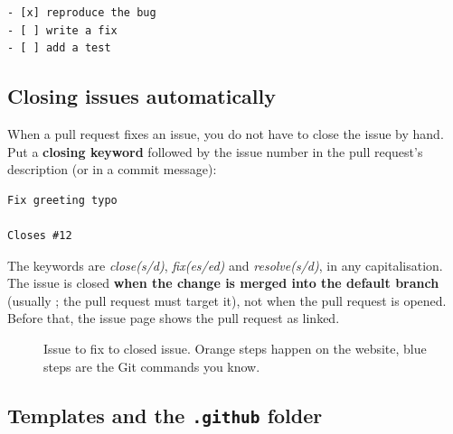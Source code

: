 \begin{lstlisting}
- [x] reproduce the bug
- [ ] write a fix
- [ ] add a test
\end{lstlisting}

\subsection{Closing issues automatically}

When a pull request fixes an issue, you do not have to close the issue by hand. Put a \textbf{closing keyword} followed by the issue number in the pull request's description (or in a commit message):

\begin{lstlisting}
Fix greeting typo

Closes #12
\end{lstlisting}

The keywords are \emph{close(s/d)}, \emph{fix(es/ed)} and \emph{resolve(s/d)}, in any capitalisation. The issue is closed \textbf{when the change is merged into the default branch} (usually ; the pull request must target it), not when the pull request is opened. Before that, the issue page shows the pull request as linked.

\begin{figure}[H]
\centering
{}
\caption{Issue to fix to closed issue. Orange steps happen on the website, blue steps are the Git commands you know.}
\label{fig:issue}
\end{figure}

\subsection{Templates and the \texttt{.github} folder}

